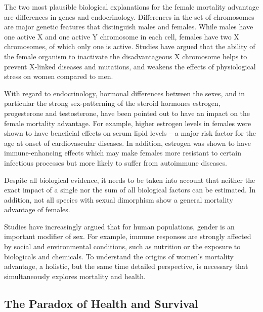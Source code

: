 The two most plausible biological explanations for the female mortality advantage 
are differences in genes and endocrinology.\citep{hubbard2011frailty} Differences 
in the set of chromosomes are major genetic features that distinguish males and 
females. While males have one active X and one active Y chromosome in each cell, 
females have two X chromosomes, of which only one is active.\citep{christensen2001x} 
Studies have argued that the ability of the female organism to inactivate the 
disadvantageous X chromosome helps to prevent X-linked diseases and mutations, 
and weakens the effects of physiological stress on women compared to men.\citep{seifarth2012sex}

With regard to endocrinology, hormonal differences between the 
sexes, and in particular the strong sex-patterning of the steroid hormones 
estrogen, progesterone and testosterone, have been pointed out to have an impact 
on the female mortality advantage.\citep{regan2013gender} For example, higher 
estrogen levels in females were shown to have beneficial effects on serum lipid 
levels -- a major risk factor for the age at onset of cardiovascular diseases.\citep{eskes2007women} 
In addition, estrogen was shown to have immune-enhancing effects which may make 
females more resistant to certain infectious processes but more likely to suffer 
from autoimmune diseases.\citep{bouman2005sex}

Despite all biological evidence, it needs to be taken into account that neither 
the exact impact of a single nor the sum of all biological factors can be 
estimated. In addition, not all species with sexual dimorphism show a 
general mortality advantage of females.\citep{austad2006women,austad2016sex}

Studies have increasingly argued that for human populations, gender is an 
important modifier of sex.\citep{rieker2005rethinking} For example, immune 
responses are strongly affected by social and environmental conditions, such 
as nutrition or the exposure to biologicals and chemicals.\citep{oertelt2012influence} 
To understand the origins of women's mortality advantage, a holistic, but 
the same time detailed perspective, is necessary that simultaneously explores 
mortality and health. \\




\subsection{The Paradox of Health and Survival}

